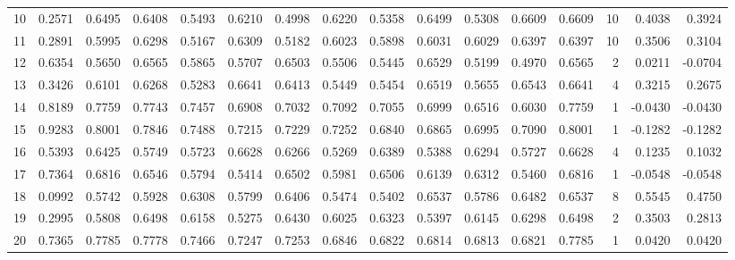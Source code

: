 \begin{tabular}{lrrrrrrrrrrrrrrr}
10  &      0.2571 &  0.6495 &  0.6408 &  0.5493 &  0.6210 &  0.4998 &  0.6220 &  0.5358 &  0.6499 &  0.5308 &   0.6609 &     0.6609 &     10 &                    0.4038 &                     0.3924 \\
11  &      0.2891 &  0.5995 &  0.6298 &  0.5167 &  0.6309 &  0.5182 &  0.6023 &  0.5898 &  0.6031 &  0.6029 &   0.6397 &     0.6397 &     10 &                    0.3506 &                     0.3104 \\
12  &      0.6354 &  0.5650 &  0.6565 &  0.5865 &  0.5707 &  0.6503 &  0.5506 &  0.5445 &  0.6529 &  0.5199 &   0.4970 &     0.6565 &      2 &                    0.0211 &                    -0.0704 \\
13  &      0.3426 &  0.6101 &  0.6268 &  0.5283 &  0.6641 &  0.6413 &  0.5449 &  0.5454 &  0.6519 &  0.5655 &   0.6543 &     0.6641 &      4 &                    0.3215 &                     0.2675 \\
14  &      0.8189 &  0.7759 &  0.7743 &  0.7457 &  0.6908 &  0.7032 &  0.7092 &  0.7055 &  0.6999 &  0.6516 &   0.6030 &     0.7759 &      1 &                   -0.0430 &                    -0.0430 \\
15  &      0.9283 &  0.8001 &  0.7846 &  0.7488 &  0.7215 &  0.7229 &  0.7252 &  0.6840 &  0.6865 &  0.6995 &   0.7090 &     0.8001 &      1 &                   -0.1282 &                    -0.1282 \\
16  &      0.5393 &  0.6425 &  0.5749 &  0.5723 &  0.6628 &  0.6266 &  0.5269 &  0.6389 &  0.5388 &  0.6294 &   0.5727 &     0.6628 &      4 &                    0.1235 &                     0.1032 \\
17  &      0.7364 &  0.6816 &  0.6546 &  0.5794 &  0.5414 &  0.6502 &  0.5981 &  0.6506 &  0.6139 &  0.6312 &   0.5460 &     0.6816 &      1 &                   -0.0548 &                    -0.0548 \\
18  &      0.0992 &  0.5742 &  0.5928 &  0.6308 &  0.5799 &  0.6406 &  0.5474 &  0.5402 &  0.6537 &  0.5786 &   0.6482 &     0.6537 &      8 &                    0.5545 &                     0.4750 \\
19  &      0.2995 &  0.5808 &  0.6498 &  0.6158 &  0.5275 &  0.6430 &  0.6025 &  0.6323 &  0.5397 &  0.6145 &   0.6298 &     0.6498 &      2 &                    0.3503 &                     0.2813 \\
20  &      0.7365 &  0.7785 &  0.7778 &  0.7466 &  0.7247 &  0.7253 &  0.6846 &  0.6822 &  0.6814 &  0.6813 &   0.6821 &     0.7785 &      1 &                    0.0420 &                     0.0420 \\

\end{tabular}
